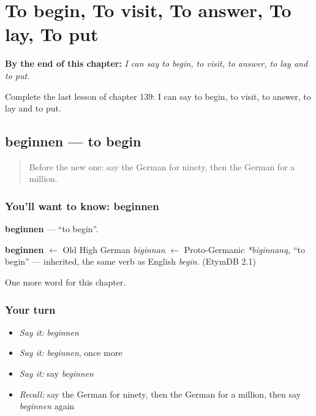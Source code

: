
\chapter{To begin, To visit, To answer, To lay, To put}
\label{ch:ge-to-begin-to-visit-to-answer-to-lay-to-put}

\begin{chapteropening}
\textbf{By the end of this chapter:} \emph{I can say to begin, to visit, to answer, to lay and to put.}

Complete the last lesson of chapter 139: I can say to begin, to visit, to answer, to lay and to put.
\end{chapteropening}

\section[beginnen]{beginnen — to begin}

\label{lesson:GE-C139-beginnen}



\begin{quote}
Before the new one: say the German for ninety, then the German for a million.
\end{quote}

\subsection*{You'll want to know: beginnen}
\textbf{beginnen} — \textquotedblleft{}to begin\textquotedblright{}.

\begin{cousinweb}
\textbf{beginnen} $\leftarrow$ Old High German \emph{biginnan} $\leftarrow$ Proto-Germanic \emph{*biginnaną}, \textquotedblleft{}to begin\textquotedblright{} — inherited, the same verb as English \emph{begin}. (EtymDB 2.1)
\end{cousinweb}

\begin{grammarlens}[title={What you've built}]
One more word for this chapter.
\end{grammarlens}

\subsection*{Your turn}
\begin{itemize}
\raggedright
  \item \emph{Say it:} \emph{beginnen}
  \item \emph{Say it:} \emph{beginnen}, once more
  \item \emph{Say it:} say \emph{beginnen}
  \item \emph{Recall:} say the German for ninety, then the German for a million, then say \emph{beginnen} again
\end{itemize}

